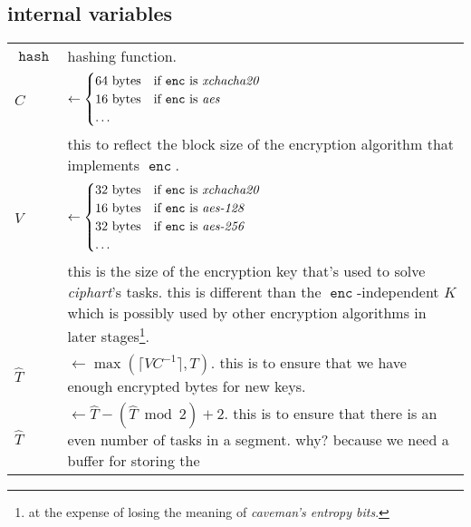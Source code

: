 \documentclass[twocolumn]{article}
\DeclareMathOperator{\enc}{\mathtt{enc}}
\DeclareMathOperator{\maxf}{max}
\DeclareMathOperator{\hash}{\mathtt{hash}}
\begin{document}
\subsection{internal variables}
\begin{tabularx}{\columnwidth}{lX}
    $\hash$ & hashing function.\\
    $C$         & $\gets \begin{cases}
                        64 \text{ bytes} & \text{if $\enc$ is
                                            \emph{xchacha20}}\\
                        16 \text{ bytes} & \text{if $\enc$ is \emph{aes}}\\
                        \ldots & \\
                     \end{cases}$\\
                & this to reflect the block size of the encryption
                    algorithm that implements $\enc$.\\
    $V$ & $\gets \begin{cases}
                        32 \text{ bytes} & \text{if $\enc$ is
                                            \emph{xchacha20}}\\
                        16 \text{ bytes} & \text{if $\enc$ is
                            \emph{aes-128}}\\
                        32 \text{ bytes} & \text{if $\enc$ is
                            \emph{aes-256}}\\
                        \ldots & \\
                     \end{cases}$\\
                & this is the size of the encryption key that's used to
                    solve \emph{ciphart}'s tasks.  this is different than
                    the $\enc$-independent $K$ which is
                    possibly used by other encryption algorithms in later
                    stages\footnote{at the expense of losing the meaning of
                    \emph{caveman's entropy bits}.}.\\
    $\hat T$    & $\gets \maxf(\lceil V C^{-1}\rceil, T)$.  this
                    is to ensure that we have enough encrypted bytes for
                    new keys.\\
    $\hat T$    & $\gets \hat T - (\hat T \bmod 2) + 2$.  this is to ensure
                    that there is an even number of tasks in a segment.
                    why?  because we need a buffer for storing the

\end{tabularx}
\end{document}
